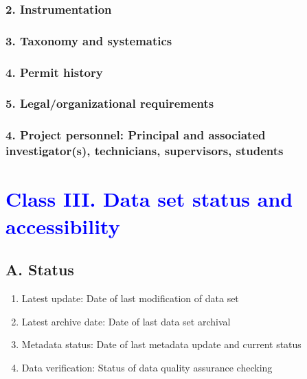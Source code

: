 \documentclass[a4paper,twoside,10pt]{article}
\begin{document}
        		\subsubsection*{2. Instrumentation}
        		
        		\subsubsection*{3. Taxonomy and systematics}
        		
        		\subsubsection*{4. Permit history}
        		
        		\subsubsection*{5. Legal/organizational requirements}
        	

        \subsubsection*{4. Project personnel: Principal and associated investigator(s), technicians, supervisors, students}
 \section*{\textcolor{Blue}{Class III. Data set status and accessibility}}
    \subsection*{A. Status}
    \begin{enumerate}
      \item Latest update: Date of last modification of data set
      \item Latest archive date: Date of last data set archival
      \item Metadata status: Date of last metadata update and current status
      \item Data verification: Status of data quality assurance checking
    \end{enumerate}
      
\end{document}
